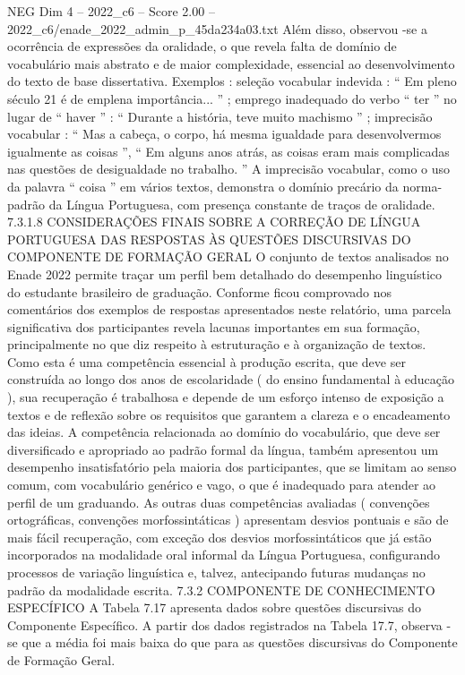 \begin{textsample}{NEG Dim 4 – 2022\_c6 – Score 2.00 – 2022\_c6/enade\_2022\_admin\_p\_45da234a03.txt}
Além disso, observou -se a ocorrência de expressões da oralidade, o que revela falta de domínio de vocabulário mais abstrato e de maior complexidade, essencial ao desenvolvimento do texto de base dissertativa.
Exemplos : seleção vocabular indevida : “ Em pleno século 21 é de emplena importância... ” ; emprego inadequado do verbo “ ter ” no lugar de “ haver ” : “ Durante a história, teve muito machismo ” ; imprecisão vocabular : “ Mas a cabeça, o corpo, há mesma igualdade para desenvolvermos igualmente as coisas ”, “ Em alguns anos atrás, as coisas eram mais complicadas nas questões de desigualdade no trabalho. ” A imprecisão vocabular, como o uso da palavra “ coisa ” em vários textos, demonstra o domínio precário da norma-padrão da Língua Portuguesa, com presença constante de traços de oralidade. 7.3.1.8 CONSIDERAÇÕES FINAIS SOBRE A CORREÇÃO DE LÍNGUA PORTUGUESA DAS RESPOSTAS ÀS QUESTÕES DISCURSIVAS DO COMPONENTE DE FORMAÇÃO GERAL O conjunto de textos analisados no Enade 2022 permite traçar um perfil bem detalhado do desempenho linguístico do estudante brasileiro de graduação.
Conforme ficou comprovado nos comentários dos exemplos de respostas apresentados neste relatório, uma parcela significativa dos participantes revela lacunas importantes em sua formação, principalmente no que diz respeito à estruturação e à organização de textos.
Como esta é uma competência essencial à produção escrita, que deve ser construída ao longo dos anos de escolaridade ( do ensino fundamental à educação ), sua recuperação é trabalhosa e depende de um esforço intenso de exposição a textos e de reflexão sobre os requisitos que garantem a clareza e o encadeamento das ideias.
A competência relacionada ao domínio do vocabulário, que deve ser diversificado e apropriado ao padrão formal da língua, também apresentou um desempenho insatisfatório pela maioria dos participantes, que se limitam ao senso comum, com vocabulário genérico e vago, o que é inadequado para atender ao perfil de um graduando.
As outras duas competências avaliadas ( convenções ortográficas, convenções morfossintáticas ) apresentam desvios pontuais e são de mais fácil recuperação, com exceção dos desvios morfossintáticos que já estão incorporados na modalidade oral informal da Língua Portuguesa, configurando processos de variação linguística e, talvez, antecipando futuras mudanças no padrão da modalidade escrita. 7.3.2 COMPONENTE DE CONHECIMENTO ESPECÍFICO A Tabela 7.17 apresenta dados sobre questões discursivas do Componente Específico.
A partir dos dados registrados na Tabela 17.7, observa -se que a média foi mais baixa do que para as questões discursivas do Componente de Formação Geral.

\end{textsample}
